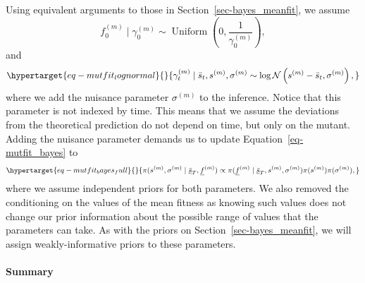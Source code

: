 \documentclass[
  letterpaper,
  DIV=11,
  numbers=noendperiod]{scrartcl}
\let\oldparagraph\paragraph
\renewcommand{\paragraph}[1]{\oldparagraph{#1}\mbox{}}
\begin{document}
\begin{refsegment}
Using equivalent arguments to those in Section~\ref{sec-bayes_meanfit},
we assume \[
f_0^{(m)} \mid \gamma_0^{(m)} \sim 
\operatorname{Uniform}\left(0, \frac{1}{\gamma_0^{(m)}} \right),
\] and \begin{equation}\protect\hypertarget{eq-mutfit_lognormal}{}{
\gamma_t^{(m)} \mid \bar{s}_t, s^{(m)}, \sigma^{(m)} \sim 
\log\mathcal{N}\left(s^{(m)} - \bar{s}_t, \sigma^{(m)} \right),
}\label{eq-mutfit_lognormal}\end{equation} where we add the nuisance
parameter \(\sigma^{(m)}\) to the inference. Notice that this parameter
is not indexed by time. This means that we assume the deviations from
the theoretical prediction do not depend on time, but only on the
mutant. Adding the nuisance parameter demands us to update
Equation~\ref{eq-mutfit_bayes} to
\begin{equation}\protect\hypertarget{eq-mutfit_bayes_full}{}{
\pi(
    s^{(m)}, \sigma^{(m)} \mid \underline{\bar{s}}_T, \underline{f}^{(m)}
) \propto
\pi(\underline{f}^{(m)} \mid \underline{\bar{s}}_T, s^{(m)}, \sigma^{(m)})
\pi(s^{(m)}) \pi(\sigma^{(m)}),
}\label{eq-mutfit_bayes_full}\end{equation} where we assume independent
priors for both parameters. We also removed the conditioning on the
values of the mean fitness as knowing such values does not change our
prior information about the possible range of values that the parameters
can take. As with the priors on Section~\ref{sec-bayes_meanfit}, we will
assign weakly-informative priors to these parameters.

\hypertarget{summary-2}{%
\paragraph{Summary}\label{summary-2}}


\end{refsegment}
\end{document}

